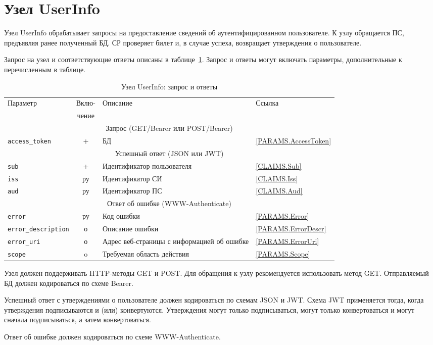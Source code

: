 \section{Узел UserInfo}\label{OIDC.UserInfo}

Узел UserInfo обрабатывает запросы на предоставление сведений 
об аутентифицированном пользователе. 
% 
К узлу обращается ПС, предъявляя ранее полученный БД.
%
СР проверяет билет и, в случае успеха, возвращает утверждения о пользователе.


Запрос на узел и соответствующие ответы описаны в 
таблице~\ref{Table.OIDC.UserInfo}.
%
Запрос и ответы могут включать параметры, дополнительные к перечисленным в 
таблице.

\begin{table}[H]
\caption{Узел UserInfo: запрос и ответы}\label{Table.OIDC.UserInfo}  
\begin{tabular}{|l|c|p{8.9cm}|l|}
\hline
\multirow{2}{*}{Параметр} & Вклю- & \multirow{2}{*}{Описание} & \multirow{2}{*}{Ссылка}\\
                          & чение &&\\
\hline
\hline
\multicolumn{4}{|c|}{Запрос (GET/Bearer или POST/Bearer)}\\
\hline
\hline
%
\lstinline!access_token! & + & 
БД & 
\ref{PARAMS.AccessToken}\\
\hline
%
\hline
\multicolumn{4}{|c|}{Успешный ответ (JSON или JWT)}\\
\hline
\hline
%
\lstinline!sub! & + &
Идентификатор пользователя & 
\ref{CLAIMS.Sub}\\
\hline
%
\lstinline!iss! & ру & 
Идентификатор СИ & 
\ref{CLAIMS.Iss}\\
\hline
%
\lstinline!aud! & ру & 
Идентификатор ПС & 
\ref{CLAIMS.Aud}\\
\hline
%
\hline
\multicolumn{4}{|c|}{Ответ об ошибке (WWW-Authenticate)}\\
\hline
\hline
%
\lstinline!error! & ру & 
Код ошибки & 
\ref{PARAMS.Error}\\
\hline
%
\lstinline!error_description! & о & 
Описание ошибки &
\ref{PARAMS.ErrorDescr}\\
\hline
%
\lstinline!error_uri! & о & 
Адрес веб-страницы с информацией об ошибке &
\ref{PARAMS.ErrorUri}\\
\hline
%
\lstinline!scope! & o & 
Требуемая область действия & 
\ref{PARAMS.Scope}\\
\hline
\end{tabular}
\end{table}

Узел должен поддерживать HTTP-методы GET и POST. Для обращения к узлу 
рекомендуется использовать метод GET. 
%
Отправляемый БД должен кодироваться по схеме Bearer.

Успешный ответ с утверждениями о пользователе должен кодироваться по схемам 
JSON и JWT. 
%
Схема JWT применяется тогда, когда утверждения подписываются и (или) 
конвертуются. 
%
Утверждения могут только подписываться, могут только конвертоваться и могут 
сначала подписываться, а затем конвертоваться.

Ответ об ошибке должен кодироваться по схеме WWW-Authenticate.
